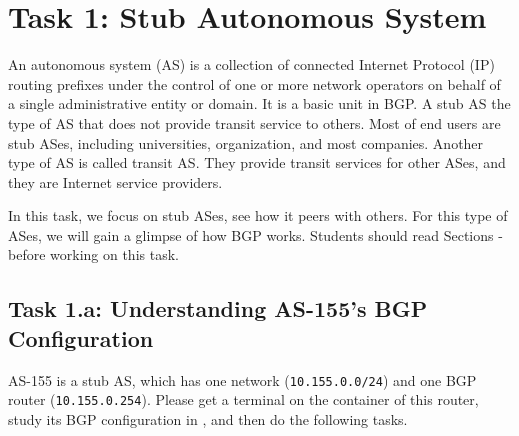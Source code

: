 \section{Task 1: Stub Autonomous System} 

An autonomous system (AS) is a collection of connected Internet Protocol (IP) routing prefixes
under the control of one or more network operators on behalf of a single administrative entity
or domain. It is a basic unit in BGP. 
A stub AS the type of AS that does not provide transit service to others.
Most of end users are stub ASes, including universities, organization,
and most companies. Another type of AS is called transit AS. They
provide transit services for other ASes, and they 
are Internet service providers.  

In this task, we focus on stub ASes, see how it peers with others. 
For this type of ASes, we will gain a glimpse of how BGP works. 
Students should read Sections \bgpintro - \bgpupdate 
before working on this task. 



 

\subsection{Task 1.a: Understanding AS-155's BGP Configuration} 

AS-155 is a stub AS, which has one network (\texttt{10.155.0.0/24})
and one BGP router (\texttt{10.155.0.254}). 
Please  get a terminal on the container of this router, study its 
BGP configuration in , and then
do the following tasks.

